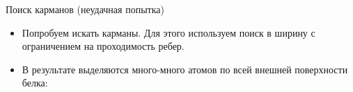 \documentclass[10pt, xcolor={dvipsnames}]{beamer}
\begin{document}
\begin{frame}{Поиск карманов (неудачная попытка) }
\begin{itemize}
\item Попробуем искать карманы. Для этого используем поиск в ширину с ограничением на проходимость ребер. 
\item В результате выделяются много-много атомов по всей внешней поверхности белка:
\end{itemize}
\begin{center}
\end{center}
\end{frame}
\end{document}
